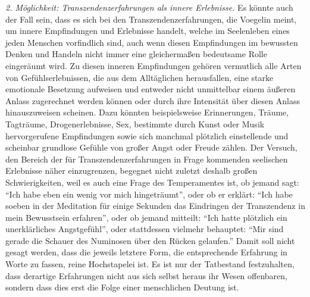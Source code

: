 {\it 2. Möglichkeit: Transzendenzerfahrungen als innere Erlebnisse.} Es könnte
auch der Fall sein, dass es sich bei den Transzendenzerfahrungen, die Voegelin
meint, um innere Empfindungen und Erlebnisse handelt, welche im Seelenleben
eines jeden Menschen vorfindlich sind, auch wenn diesen Empfindungen im
bewussten Denken und Handeln nicht immer eine gleichermaßen bedeutsame Rolle
eingeräumt wird. Zu diesen inneren Empfindungen gehören vermutlich alle Arten
von Gefühlserlebnissen, die aus dem Alltäglichen herausfallen, eine starke
emotionale Besetzung aufweisen und entweder nicht unmittelbar einem äußeren
Anlass zugerechnet werden können oder durch ihre Intensität über diesen Anlass
hinauszuweisen scheinen. Dazu könnten beispielsweise Erinnerungen, Träume,
Tagträume, Drogenerlebnisse, Sex, bestimmte durch Kunst oder Musik
hervorgerufene Empfindungen sowie sich manchmal plötzlich einstellende und
scheinbar grundlose Gefühle von großer Angst oder Freude zählen. Der Versuch,
den Bereich der für Transzendenzerfahrungen in Frage kommenden seelischen
Erlebnisse näher einzugrenzen, begegnet nicht zuletzt deshalb großen
Schwierigkeiten, weil es auch eine Frage des Temperamentes ist, ob jemand
sagt: "`Ich habe eben ein wenig vor mich hingeträumt"', oder ob er erklärt:
"`Ich habe soeben in der Meditation für einige Sekunden das Eindringen der
Transzendenz in mein Bewusstsein erfahren"', oder ob jemand mitteilt: "`Ich
hatte plötzlich ein unerklärliches Angstgefühl"', oder stattdessen vielmehr
behauptet: "`Mir sind gerade die Schauer des Numinosen über den Rücken
gelaufen."' Damit soll nicht gesagt werden, dass die jeweils letztere Form,
die entsprechende Erfahrung in Worte zu fassen, reine Hochstapelei ist. Es ist
nur der Tatbestand festzuhalten, dass derartige Erfahrungen nicht aus sich
selbst heraus ihr Wesen offenbaren, sondern dass dies erst die Folge einer
menschlichen Deutung ist.

